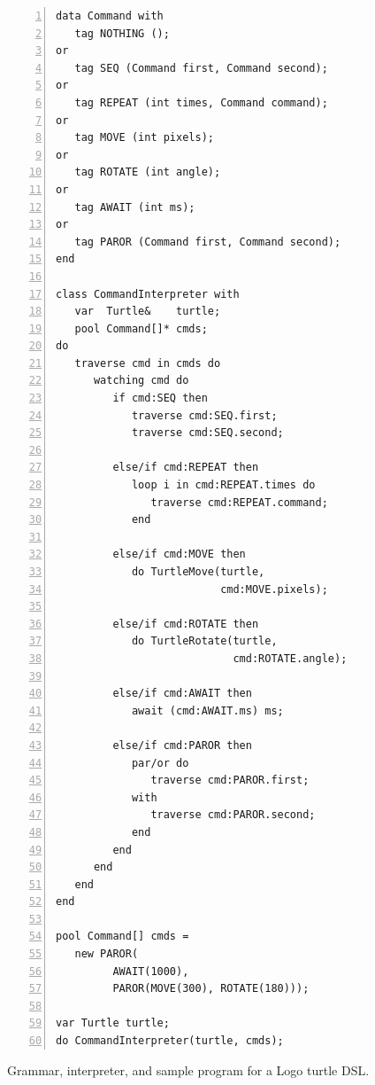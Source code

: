 \documentclass{sig-alternate}
\begin{document}
\begin{figure}[h!]
\begin{lstlisting}[numbers=left,xleftmargin=3em]
data Command with
   tag NOTHING ();
or
   tag SEQ (Command first, Command second);
or
   tag REPEAT (int times, Command command);
or
   tag MOVE (int pixels);
or
   tag ROTATE (int angle);
or
   tag AWAIT (int ms);
or
   tag PAROR (Command first, Command second);
end

class CommandInterpreter with
   var  Turtle&    turtle;
   pool Command[]* cmds;
do
   traverse cmd in cmds do
      watching cmd do
         if cmd:SEQ then
            traverse cmd:SEQ.first;
            traverse cmd:SEQ.second;

         else/if cmd:REPEAT then
            loop i in cmd:REPEAT.times do
               traverse cmd:REPEAT.command;
            end

         else/if cmd:MOVE then
            do TurtleMove(turtle,
                          cmd:MOVE.pixels);

         else/if cmd:ROTATE then
            do TurtleRotate(turtle,
                            cmd:ROTATE.angle);

         else/if cmd:AWAIT then
            await (cmd:AWAIT.ms) ms;

         else/if cmd:PAROR then
            par/or do
               traverse cmd:PAROR.first;
            with
               traverse cmd:PAROR.second;
            end
         end
      end
   end
end

pool Command[] cmds =
   new PAROR(
         AWAIT(1000),
         PAROR(MOVE(300), ROTATE(180)));

var Turtle turtle;
do CommandInterpreter(turtle, cmds);
\end{lstlisting}
\caption{Grammar, interpreter, and sample program for a Logo turtle DSL.
\label{lst.turtle}
}
\end{figure}
\end{document}
